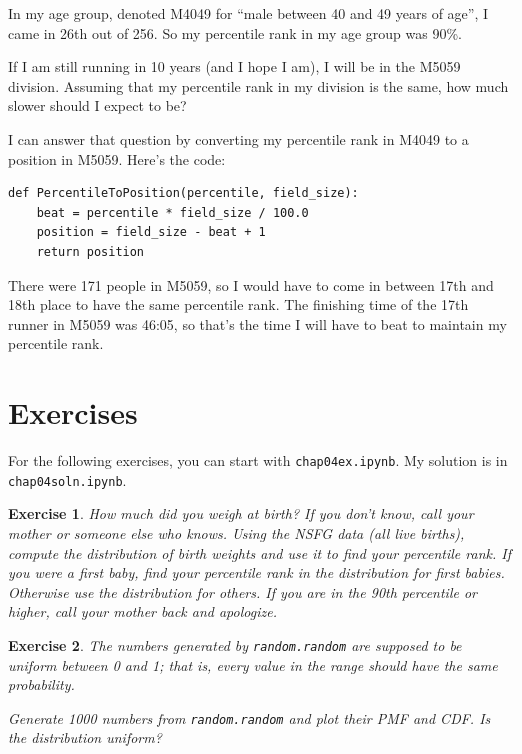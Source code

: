 \documentclass[12pt]{book}
\theoremstyle{exercise}
\newtheorem{exercise}{Exercise}[chapter]
\begin{document}
In my age group, denoted M4049 for ``male between 40 and 49 years of
age'', I came in 26th out of 256.  So my percentile rank in my age
group was 90\%.%

If I am still running in 10 years (and I hope I am), I will be in
the M5059 division.  Assuming that my percentile rank in my division
is the same, how much slower should I expect to be?

I can answer that question by converting my percentile rank in M4049
to a position in M5059.  Here's the code:

\begin{verbatim}
def PercentileToPosition(percentile, field_size):
    beat = percentile * field_size / 100.0
    position = field_size - beat + 1
    return position
\end{verbatim}

There were 171 people in M5059, so I would have to come in between
17th and 18th place to have the same percentile rank.  The finishing
time of the 17th runner in M5059 was 46:05, so that's the time I will
have to beat to maintain my percentile rank.


\section{Exercises}

For the following exercises, you can start with \verb"chap04ex.ipynb".
My solution is in \verb"chap04soln.ipynb".

\begin{exercise}
How much did you weigh at birth?  If you don't know, call your mother
or someone else who knows.  Using the NSFG data (all live births),
compute the distribution of birth weights and use it to find your
percentile rank.  If you were a first baby, find your percentile rank
in the distribution for first babies.  Otherwise use the distribution
for others.  If you are in the 90th percentile or higher, call your
mother back and apologize.%
%

\end{exercise}

\begin{exercise}
The numbers generated by {\tt random.random} are supposed to be
uniform between 0 and 1; that is, every value in the range
should have the same probability.

Generate 1000 numbers from {\tt random.random} and plot their
PMF and CDF.  Is the distribution uniform?%
%
%

\end{exercise}
\end{document}

